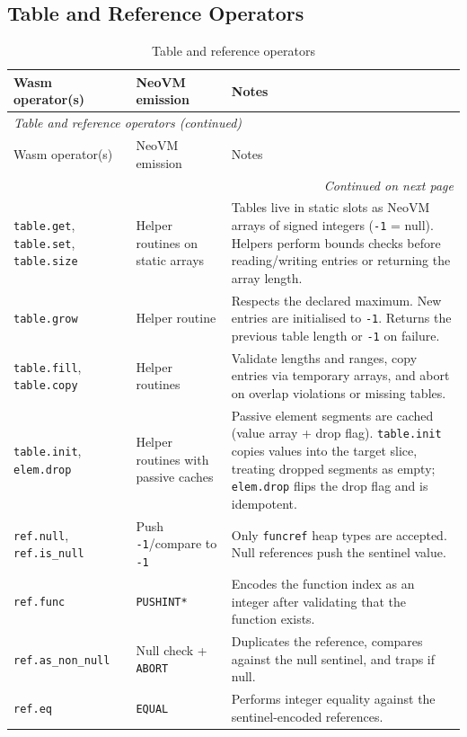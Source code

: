 \documentclass[11pt]{article}
\begin{document}
\subsection{Table and Reference Operators}
\begin{longtable}{@{}p{4.7cm}p{3.8cm}p{6.5cm}@{}}
\caption{Table and reference operators}\\
\toprule
Wasm operator(s) & NeoVM emission & Notes \\
\midrule
\endfirsthead
\multicolumn{3}{l}{\textit{Table and reference operators (continued)}}\\
\toprule
Wasm operator(s) & NeoVM emission & Notes \\
\midrule
\endhead
\midrule
\multicolumn{3}{r}{\textit{Continued on next page}}\\
\bottomrule
\endfoot
\bottomrule
\endlastfoot
\texttt{table.get}, \texttt{table.set}, \texttt{table.size} & Helper routines on static arrays & Tables live in static slots as NeoVM arrays of signed integers (\texttt{-1} = null). Helpers perform bounds checks before reading/writing entries or returning the array length.
\tabularnewline
\texttt{table.grow} & Helper routine & Respects the declared maximum. New entries are initialised to \texttt{-1}. Returns the previous table length or \texttt{-1} on failure.
\tabularnewline
\texttt{table.fill}, \texttt{table.copy} & Helper routines & Validate lengths and ranges, copy entries via temporary arrays, and abort on overlap violations or missing tables.
\tabularnewline
\texttt{table.init}, \texttt{elem.drop} & Helper routines with passive caches & Passive element segments are cached (value array + drop flag). \texttt{table.init} copies values into the target slice, treating dropped segments as empty; \texttt{elem.drop} flips the drop flag and is idempotent.
\tabularnewline
\texttt{ref.null}, \texttt{ref.is\_null} & Push \texttt{-1}/compare to \texttt{-1} & Only \texttt{funcref} heap types are accepted. Null references push the sentinel value.
\tabularnewline
\texttt{ref.func} & \texttt{PUSHINT*} & Encodes the function index as an integer after validating that the function exists.
\tabularnewline
\texttt{ref.as\_non\_null} & Null check + \texttt{ABORT} & Duplicates the reference, compares against the null sentinel, and traps if null.
\tabularnewline
\texttt{ref.eq} & \texttt{EQUAL} & Performs integer equality against the sentinel-encoded references.
\tabularnewline
\end{longtable}
\end{document}
